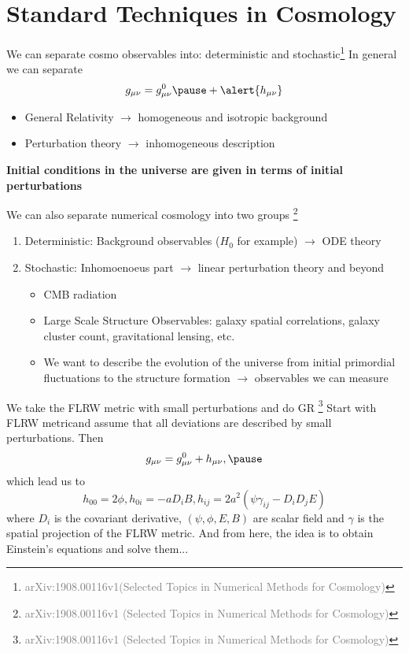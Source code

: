 \documentclass[aspectratio=169, 12pt]{beamer}
\newcommand{\gray}[1]{\textcolor{gray}{#1}}
\begin{document}
\section{Standard Techniques in Cosmology}
\begin{frame}{We can separate cosmo observables into: deterministic and stochastic\footnote {\tiny{\gray{arXiv:1908.00116v1(Selected Topics in Numerical Methods for Cosmology)}}}}
In general we can separate
\begin{displaymath}
  g_{\mu\nu} = g_{\mu\nu}^{0} \pause + \alert{h_{\mu\nu}}
\end{displaymath}
\begin{itemize}
	\item General Relativity $\rightarrow$ homogeneous and isotropic background \pause 
	\item \alert{Perturbation theory} $\rightarrow$ inhomogeneous description \pause
\end{itemize}
\textbf{Initial conditions in the universe are given in terms of initial perturbations}
\end{frame}
\begin{frame}{We can also separate numerical cosmology into two groups \footnote{\tiny{\gray{arXiv:1908.00116v1 (Selected Topics in Numerical Methods for Cosmology)}}}}
\begin{enumerate}
	\item \alert{Deterministic:} Background observables ($H_0$ for example) $\rightarrow$ ODE theory
	\item \alert{Stochastic:} Inhomoenoeus part $\rightarrow$ linear perturbation theory and beyond
	\begin{itemize}
		\item CMB radiation
		\item Large Scale Structure Observables: galaxy spatial correlations, galaxy cluster count, gravitational lensing, etc.
		\item We want to describe the evolution of the universe from initial primordial fluctuations to the structure formation $\rightarrow$ observables we can measure
	\end{itemize}
\end{enumerate}	
\end{frame}
\begin{frame}{We take the FLRW metric with small perturbations and do GR \footnote{\tiny{\gray{arXiv:1908.00116v1 (Selected Topics in Numerical Methods for Cosmology)}}}}
Start with FLRW metricand assume that all deviations are described by small perturbations. Then\pause
\begin{displaymath}
  g_{\mu\nu} = g_{\mu\nu}^{0} + h_{\mu\nu},\pause
\end{displaymath}
which lead us to
\begin{displaymath}
  h_{00} = 2\phi, h_{0i} = -a D_i B,  h_{ij} = 2a^2(\psi\gamma_{ij} -D_iD_jE)
\end{displaymath}
where $D_i$ is the covariant derivative, $(\psi,\phi,E, B)$ are scalar field and $\gamma$ is the spatial projection of the FLRW metric. \pause\alert{And from here, the idea is to obtain Einstein's equations and solve them...}
\end{frame}
\end{document}
